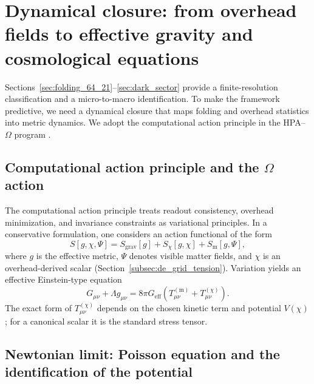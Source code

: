 
\section{Dynamical closure: from overhead fields to effective gravity and cosmological equations}
\label{sec:dynamical_closure}

Sections~\ref{sec:folding_64_21}--\ref{sec:dark_sector} provide a finite-resolution classification and a micro-to-macro identification.
To make the framework predictive, we need a dynamical closure that maps folding and overhead statistics into metric dynamics.
We adopt the computational action principle in the HPA--$\Omega$ program \cite{Ma2025CAP,Ma2025FoP}.

\subsection{Computational action principle and the \texorpdfstring{$\Omega$}{Omega} action}
\label{subsec:cap_action}

The computational action principle treats readout consistency, overhead minimization, and invariance constraints as variational principles.
In a conservative formulation, one considers an action functional of the form
\[
S[g,\chi,\Psi]=S_{\mathrm{grav}}[g]+S_{\chi}[g,\chi]+S_{\mathrm{m}}[g,\Psi],
\]
where $g$ is the effective metric, $\Psi$ denotes visible matter fields, and $\chi$ is an overhead-derived scalar (Section~\ref{subsec:de_grid_tension}).
Variation yields an effective Einstein-type equation
\[
G_{\mu\nu}+\Lambda g_{\mu\nu}=8\pi G_{\mathrm{eff}}\left(T_{\mu\nu}^{(\mathrm{m})}+T_{\mu\nu}^{(\chi)}\right).
\]
The exact form of $T_{\mu\nu}^{(\chi)}$ depends on the chosen kinetic term and potential $V(\chi)$; for a canonical scalar it is the standard stress tensor.

\subsection{Newtonian limit: Poisson equation and the identification of the potential}
\label{subsec:newton_limit}

